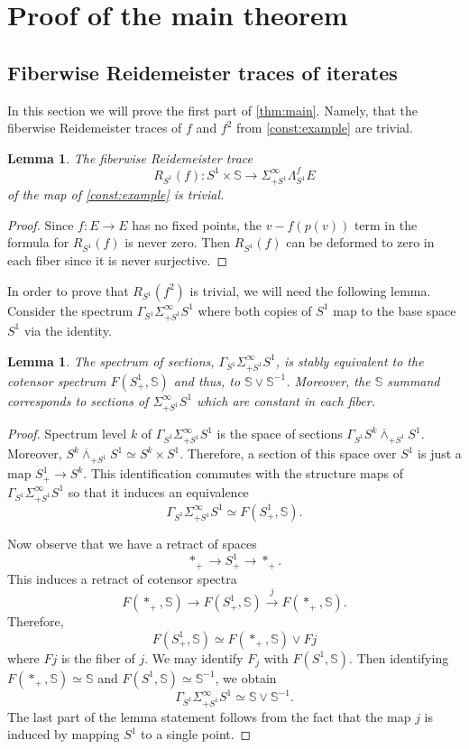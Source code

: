 \documentclass[11pt]{amsart}
\newcommand{\Sph}{\mathbb{S}}
\theoremstyle{plain}   %
\newtheorem{lem}[thm]{Lemma}
\theoremstyle{definition}
\theoremstyle{remark}
\numberwithin{equation}{section}
\begin{document}
\section{Proof of the main theorem}

\subsection{Fiberwise Reidemeister traces of iterates}

In this section we will prove the first part of \cref{thm:main}. Namely, that the fiberwise Reidemeister traces of $f$ and $f^2$ from \cref{const:example} are trivial.

\begin{lem}\label{lem:trivial f}
The fiberwise Reidemeister trace
\[
R_{S^1}(f) \colon S^1\times \Sph \to \Sigma_{+S^1}^\infty \Lambda_{S^1}^{f} E
\]
of the map of \cref{const:example} is trivial.
\end{lem}

\begin{proof}
Since $f\colon E\to E$ has no fixed points, the $v-f(p(v))$ term in the formula for $R_{S^1}(f)$ is never zero. Then $R_{S^1}(f)$ can be deformed to zero in each fiber since it is never surjective.
\end{proof}

In order to prove that $R_{S^1}(f^2)$ is trivial, we will need the following lemma. Consider the spectrum $\Gamma_{S^1}\Sigma_{+S^1}^\infty S^1$ where both copies of $S^1$ map to the base space $S^1$ via the identity. 

\begin{lem}\label{lem:split section}
The spectrum of sections, $\Gamma_{S^1}\Sigma_{+S^1}^\infty S^1$, is stably equivalent to the cotensor spectrum $F(S^1_+,\Sph)$ and thus, to $\Sph\vee  \Sph^{-1}$. Moreover, the $\Sph$ summand corresponds to sections of $\Sigma_{+S^1}^\infty S^1$ which are constant in each fiber.
\end{lem}

\begin{proof}
Spectrum level $k$ of $\Gamma_{S^1}\Sigma_{+S^1}^\infty S^1$ is the space of sections $\Gamma_{S^1}S^k\overline{\wedge}_{+S^1}S^1$. Moreover, $S^k\overline{\wedge}_{+S^1}S^1 \simeq S^k\times S^1$. Therefore, a section of this space over $S^1$ is just a map $S^1_+\to S^k$. This identification commutes with the structure maps of $\Gamma_{S^1} \Sigma_{+S^1}^\infty S^1$ so that it induces an equivalence 
\[
\Gamma_{S^1}\Sigma_{+S^1}^\infty S^1 \simeq F(S^1_+,\Sph).
\]

Now observe that we have a retract of spaces 
\[
*_+ \to S^1_+ \to *_+.
\]
This induces a retract of cotensor spectra
\[
F(*_+,\Sph) \to F(S^1_+,\Sph) \xrightarrow{j} F(*_+,\Sph).
\]
Therefore, 
\[
F(S^1_+,\Sph)\simeq F(*_+,\Sph)\vee Fj
\]
where $Fj$ is the fiber of $j$. We may identify $F_j$ with $F(S^1,\Sph)$. Then identifying $F(*_+,\Sph)\simeq \Sph$ and $F(S^1,\Sph)\simeq \Sph^{-1}$, we obtain
\[
\Gamma_{S^1} \Sigma_{+S^1}^\infty S^1\simeq \Sph\vee \Sph^{-1}.
\]
The last part of the lemma statement follows from the fact that the map $j$ is induced by mapping $S^1$ to a single point. 
\end{proof}
\end{document}
